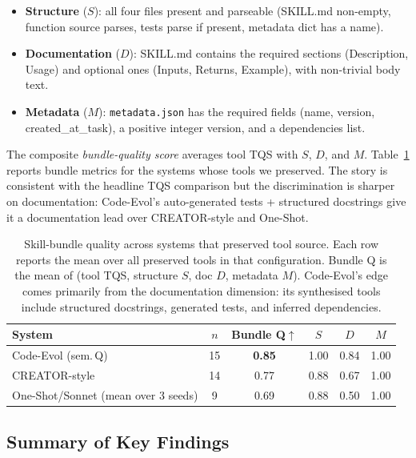 \documentclass[sigplan,nonacm,natbib=false]{acmart}
\begin{document}
\begin{itemize}
\item \textbf{Structure} ($S$): all four files present and parseable (SKILL.md non-empty, function source parses, tests parse if present, metadata dict has a name).
\item \textbf{Documentation} ($D$): SKILL.md contains the required sections (Description, Usage) and optional ones (Inputs, Returns, Example), with non-trivial body text.
\item \textbf{Metadata} ($M$): \texttt{metadata.json} has the required fields (name, version, created\_at\_task), a positive integer version, and a dependencies list.
\end{itemize}

The composite \emph{bundle-quality score} averages tool TQS with $S$, $D$, and $M$. Table~\ref{tab:skill_bundles} reports bundle metrics for the systems whose tools we preserved. The story is consistent with the headline TQS comparison but the discrimination is sharper on documentation: Code-Evol's auto-generated tests + structured docstrings give it a documentation lead over CREATOR-style and One-Shot.

\begin{table}[t]
\centering\footnotesize
\begin{tabular}{lccccc}
\toprule
\textbf{System} & $n$ & \textbf{Bundle Q}$\uparrow$ & $S$ & $D$ & $M$ \\
\midrule
Code-Evol (sem.\,Q) & 15 & \textbf{0.85} & 1.00 & 0.84 & 1.00 \\
CREATOR-style       & 14 & 0.77 & 0.88 & 0.67 & 1.00 \\
One-Shot/Sonnet (mean over 3 seeds) & 9 & 0.69 & 0.88 & 0.50 & 1.00 \\
\bottomrule
\end{tabular}
\caption{Skill-bundle quality across systems that preserved tool source. Each row reports the mean over all preserved tools in that configuration. Bundle Q is the mean of (tool TQS, structure $S$, doc $D$, metadata $M$). Code-Evol's edge comes primarily from the documentation dimension: its synthesised tools include structured docstrings, generated tests, and inferred dependencies.}
\label{tab:skill_bundles}
\end{table}

\subsection{Summary of Key Findings}
\end{document}
